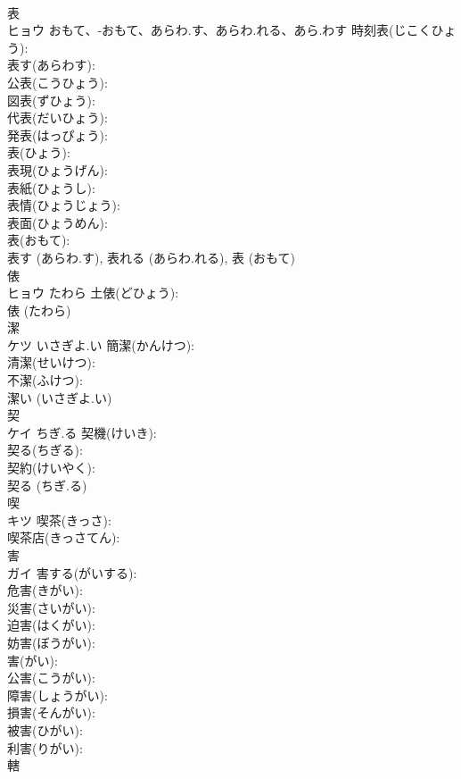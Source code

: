 \documentclass[8pt]{extreport}
\begin{document}
\begin{CJK}{UTF8}{min}
\\	表			
\\	ヒョウ	おもて、-おもて、あらわ.す、あらわ.れる、あら.わす	時刻表(じこくひょう): 
\\	表す(あらわす): 
\\	公表(こうひょう): 
\\	図表(ずひょう): 
\\	代表(だいひょう): 
\\	発表(はっぴょう): 
\\	表(ひょう): 
\\	表現(ひょうげん): 
\\	表紙(ひょうし): 
\\	表情(ひょうじょう): 
\\	表面(ひょうめん): 
\\	表(おもて): 
\\	表す (あらわ.す), 表れる (あらわ.れる), 表 (おもて)
\\	俵			
\\	ヒョウ	たわら	土俵(どひょう): 
\\	俵 (たわら)
\\	潔			
\\	ケツ	いさぎよ.い	簡潔(かんけつ): 
\\	清潔(せいけつ): 
\\	不潔(ふけつ): 
\\	潔い (いさぎよ.い)
\\	契			
\\	ケイ	ちぎ.る	契機(けいき): 
\\	契る(ちぎる): 
\\	契約(けいやく): 
\\	契る (ちぎ.る)
\\	喫			
\\	キツ		喫茶(きっさ): 
\\	喫茶店(きっさてん): 
\\	害			
\\	ガイ		害する(がいする): 
\\	危害(きがい): 
\\	災害(さいがい): 
\\	迫害(はくがい): 
\\	妨害(ぼうがい): 
\\	害(がい): 
\\	公害(こうがい): 
\\	障害(しょうがい): 
\\	損害(そんがい): 
\\	被害(ひがい): 
\\	利害(りがい): 
\\	轄			

\end{CJK}
\end{document}
